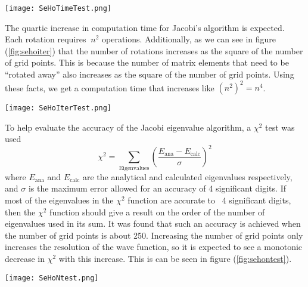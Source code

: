 \documentclass[a4paper,12pt]{report}
\begin{document}
\begin{SCfigure}
\centering
 \texttt{[image: SeHoTimeTest.png]}
 \caption{Plot of the time to converge to a solution versus the number of grid points. Used $\rho_{\mathrm{max}} = 4.61$ with the non-interacting harmonic potential.}
 \label{fig:sehotime}
\end{SCfigure}

The quartic increase in computation time for Jacobi's algorithm is expected. Each rotation requires $~n^2$ operations. Additionally, as we can see in figure (\ref{fig:sehoiter}) that the number of rotations increases as the square of the number of grid points. This is because the number of matrix elements that need to be ``rotated away'' also increases as the square of the number of grid points. Using these facts, we get a computation time that increases like $(n^2)^2 = n^4$.

\begin{SCfigure}
\centering
 \texttt{[image: SeHoIterTest.png]}
 \caption{Plot of the number of rotations required for all non-diagonal elements to be zero versus the number of grid points used. Used $\rho_{\mathrm{max}} = 4.61$ with the non-interacting harmonic potential.}
 \label{fig:sehoiter}
\end{SCfigure}

To help evaluate the accuracy of the Jacobi eigenvalue algorithm, a $\chi^2$ test was used
\begin{equation}
 \chi^2 = \sum_{\mathrm{Eigenvalues}}\left(\frac{E_{\mathrm{ana}} - E_{\mathrm{calc}}}{\sigma}\right)^2
\end{equation}
where $E_{\mathrm{ana}}$ and $E_{\mathrm{calc}}$ are the analytical and calculated eigenvalues respectively, and $\sigma$ is the maximum error allowed for an accuracy of 4 significant digits. If most of the eigenvalues in the $\chi^2$ function are accurate to ~4 significant digits, then the $\chi^2$ function should give a result on the order of the number of eigenvalues used in its sum. It was found that such an accuracy is achieved when the number of grid points is about 250. Increasing the number of grid points only increases the resolution of the wave function, so it is expected to see a monotonic decrease in $\chi^2$ with this increase. This is can be seen in figure (\ref{fig:sehontest}). 

\begin{SCfigure}
\centering
 \texttt{[image: SeHoNtest.png]}
 \caption{Plot of the $\chi^2$ function vs the number of grid points in the region where eigenvalues reach an accuracy of 4 significant digits. Used $\rho_{\mathrm{max}} = 4.61$ with the non-interacting harmonic potential.}
 \label{fig:sehontest}
\end{SCfigure}
\end{document}
